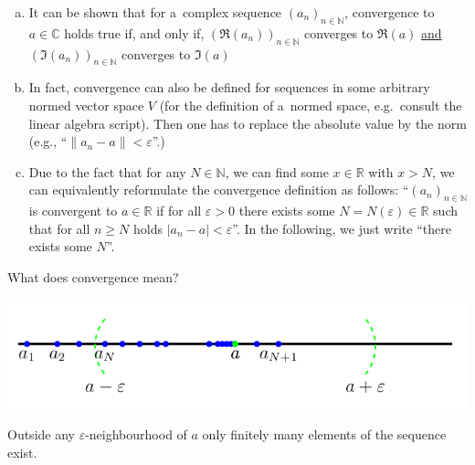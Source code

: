 \begin{Remark}{}
\begin{enumerate}[(a)]
\item It can be shown that for a~complex sequence $(a_n)_{n\in\mathbb{N}}$, convergence to $a\in\mathbb{C}$ holds true if, and only if, $(\Re(a_n))_{n\in\mathbb{N}}$ converges to $\Re(a)$ \underline{and} $(\Im(a_n))_{n\in\mathbb{N}}$ converges to $\Im(a)$
\item In fact, convergence can also be defined for sequences in some arbitrary normed vector space $V$ (for the definition of a~normed space, e.g.\ consult the linear algebra script). Then one has to replace the absolute value by the norm (e.g., ``$\|a_n-a\|<\varepsilon$''.)
\item Due to the fact that for any $N\in\mathbb{N}$, we can find some $x\in\mathbb{R}$ with $x>N$, we can equivalently reformulate the convergence definition as follows:
``$(a_n)_{n\in\mathbb{N}}$ is convergent to $a\in \mathbb{R}$ if for all $\varepsilon>0$ there exists some $N=N(\varepsilon)\in\mathbb{R}$ such that for all $n\geq N$ holds $|a_n-a|<\varepsilon$''. In the following, we just write ``there exists some $N$''.
\end{enumerate}
\end{Remark}

What does convergence mean?

\includegraphics{./conv2.png}

Outside any $\varepsilon$-neighbourhood of $a$ only finitely many elements of the sequence exist.

